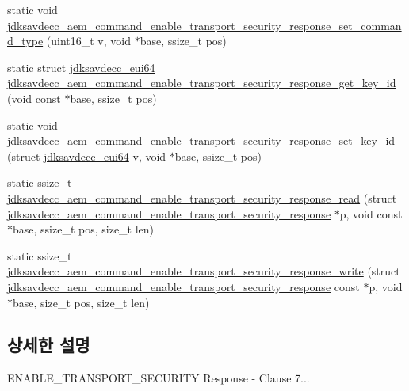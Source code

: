\begin{DoxyCompactItemize}
\item 
static void \hyperlink{group__command__enable__transport__security__response_ga60064ad2b8fdcef9888ee81971735a38}{jdksavdecc\+\_\+aem\+\_\+command\+\_\+enable\+\_\+transport\+\_\+security\+\_\+response\+\_\+set\+\_\+command\+\_\+type} (uint16\+\_\+t v, void $\ast$base, ssize\+\_\+t pos)
\item 
static struct \hyperlink{structjdksavdecc__eui64}{jdksavdecc\+\_\+eui64} \hyperlink{group__command__enable__transport__security__response_ga8778021262a7d369a63b076a21ed35dd}{jdksavdecc\+\_\+aem\+\_\+command\+\_\+enable\+\_\+transport\+\_\+security\+\_\+response\+\_\+get\+\_\+key\+\_\+id} (void const $\ast$base, ssize\+\_\+t pos)
\item 
static void \hyperlink{group__command__enable__transport__security__response_ga648fc2bb72777b59ce0004711651a533}{jdksavdecc\+\_\+aem\+\_\+command\+\_\+enable\+\_\+transport\+\_\+security\+\_\+response\+\_\+set\+\_\+key\+\_\+id} (struct \hyperlink{structjdksavdecc__eui64}{jdksavdecc\+\_\+eui64} v, void $\ast$base, ssize\+\_\+t pos)
\item 
static ssize\+\_\+t \hyperlink{group__command__enable__transport__security__response_gacc6fefae0d59df9993215ff8de7723d1}{jdksavdecc\+\_\+aem\+\_\+command\+\_\+enable\+\_\+transport\+\_\+security\+\_\+response\+\_\+read} (struct \hyperlink{structjdksavdecc__aem__command__enable__transport__security__response}{jdksavdecc\+\_\+aem\+\_\+command\+\_\+enable\+\_\+transport\+\_\+security\+\_\+response} $\ast$p, void const $\ast$base, ssize\+\_\+t pos, size\+\_\+t len)
\item 
static ssize\+\_\+t \hyperlink{group__command__enable__transport__security__response_gab502d1824ddc62d76b915c7f993ad28b}{jdksavdecc\+\_\+aem\+\_\+command\+\_\+enable\+\_\+transport\+\_\+security\+\_\+response\+\_\+write} (struct \hyperlink{structjdksavdecc__aem__command__enable__transport__security__response}{jdksavdecc\+\_\+aem\+\_\+command\+\_\+enable\+\_\+transport\+\_\+security\+\_\+response} const $\ast$p, void $\ast$base, size\+\_\+t pos, size\+\_\+t len)
\end{DoxyCompactItemize}


\subsection{상세한 설명}
E\+N\+A\+B\+L\+E\+\_\+\+T\+R\+A\+N\+S\+P\+O\+R\+T\+\_\+\+S\+E\+C\+U\+R\+I\+TY Response -\/ Clause 7... 


